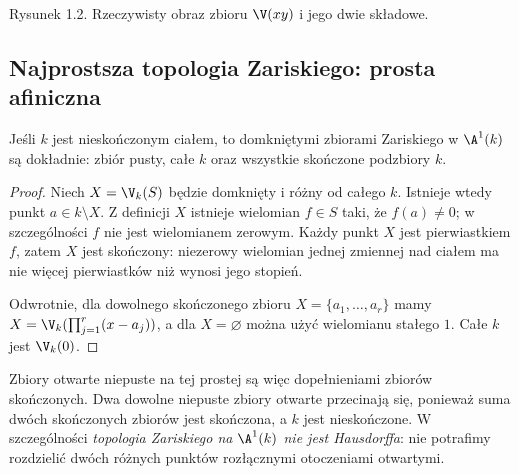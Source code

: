 \begin{center}
\end{center}
\begin{center}\small Rysunek 1.2. Rzeczywisty obraz zbioru $\V(xy)$ i jego dwie składowe.\end{center}

\subsection{Najprostsza topologia Zariskiego: prosta afiniczna}

\begin{stwierdzenie}
\label{st:A1-top}
Jeśli $k$ jest nieskończonym ciałem, to domkniętymi zbiorami
Zariskiego w $\A^1(k)$ są dokładnie: zbiór pusty, całe $k$
oraz wszystkie skończone podzbiory $k$.
\end{stwierdzenie}
\begin{proof}
Niech $X=\V_k(S)$ będzie domknięty i różny od całego $k$.
Istnieje wtedy punkt $a\in k\setminus X$. Z definicji $X$
istnieje wielomian $f\in S$ taki, że $f(a)\ne0$;
w szczególności $f$ nie jest wielomianem zerowym.
Każdy punkt $X$ jest pierwiastkiem $f$, zatem $X$ jest skończony:
niezerowy wielomian jednej zmiennej nad ciałem ma nie więcej
pierwiastków niż wynosi jego stopień.

Odwrotnie, dla dowolnego skończonego zbioru
$X=\{a_1,\dots,a_r\}$ mamy
$X=\V_k(\prod_{j=1}^r(x-a_j))$, a dla $X=\varnothing$
można użyć wielomianu stałego $1$. Całe $k$ jest $\V_k(0)$.
\end{proof}

Zbiory otwarte niepuste na tej prostej są więc dopełnieniami
zbiorów skończonych. Dwa dowolne niepuste zbiory otwarte przecinają się,
ponieważ suma dwóch skończonych zbiorów jest skończona, a $k$ jest
nieskończone. W szczególności \emph{topologia Zariskiego na $\A^1(k)$
nie jest Hausdorffa}: nie potrafimy rozdzielić dwóch różnych punktów
rozłącznymi otoczeniami otwartymi.

